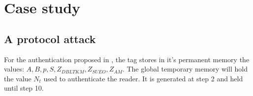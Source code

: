 \chapter{Case study}

\section{A protocol attack}

    For the authentication proposed in \cite{BOM}, the tag stores in it's permanent memory the values: \textit{$A, B, p, S, Z_{DBLTKM}, Z_{SUEO}, Z_{AM}$}.
    The global temporary memory will hold the value $N_t$
    used to authenticate the reader. It is generated at step 2 and held until step 10.

